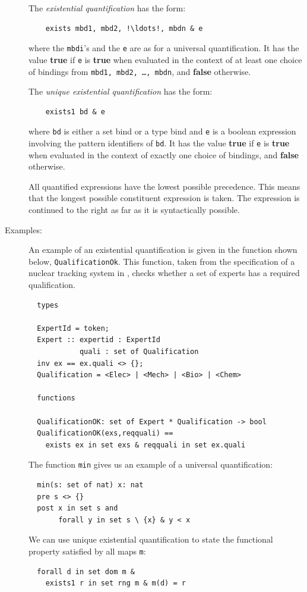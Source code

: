\documentclass{overturerepchap}
\newcommand{\keyw}[1]{{\bf\ttfamily #1}}
\begin{document}
\begin{description}
  The {\it existential quantification} has the form:
  \begin{lstlisting}
    exists mbd1, mbd2, !\ldots!, mbdn & e
  \end{lstlisting}
  where the {\tt mbdi}'s and the {\tt e} are as for a universal
  quantification. It has the value \keyw{true} if {\tt e} is \keyw{true} when
  evaluated in the context of at least one choice of bindings from
  {\tt mbd1, mbd2, \ldots, mbdn}, and \keyw{false} otherwise.

  The {\it unique existential quantification} has the form:
  \begin{lstlisting}
    exists1 bd & e
  \end{lstlisting}
  where {\tt bd} is either a set bind or a type bind and {\tt e} is a
  boolean expression involving the pattern identifiers of {\tt bd}. It
  has the value \keyw{true} if {\tt e} is \keyw{true} when evaluated in the
  context of exactly one choice of bindings, and \keyw{false} otherwise.

  All quantified expressions have the lowest possible precedence. This
  means that the longest possible constituent expression is taken. The
  expression is continued to the right as far as it is syntactically
  possible. 
  

\item[Examples:] 
  An example of an existential quantification is given in the function
  shown below, \texttt{QualificationOk}. This function, taken from the
  specification of a nuclear tracking system in \cite{Fitzgerald&98},
  checks whether a set of experts has a required qualification.
  \begin{lstlisting}
  types

  ExpertId = token;
  Expert :: expertid : ExpertId
            quali : set of Qualification
  inv ex == ex.quali <> {};
  Qualification = <Elec> | <Mech> | <Bio> | <Chem>

  functions

  QualificationOK: set of Expert * Qualification -> bool
  QualificationOK(exs,reqquali) ==
    exists ex in set exs & reqquali in set ex.quali
  \end{lstlisting}
  The function \texttt{min} gives us an example of a universal
  quantification: 
  \begin{lstlisting}
  min(s: set of nat) x: nat
  pre s <> {} 
  post x in set s and
       forall y in set s \ {x} & y < x
  \end{lstlisting}
  We can use unique existential quantification to state the functional
  property satisfied by all maps \texttt{m}:
  \begin{lstlisting}
  forall d in set dom m &
    exists1 r in set rng m & m(d) = r
  \end{lstlisting}


\end{description}
\end{document}
